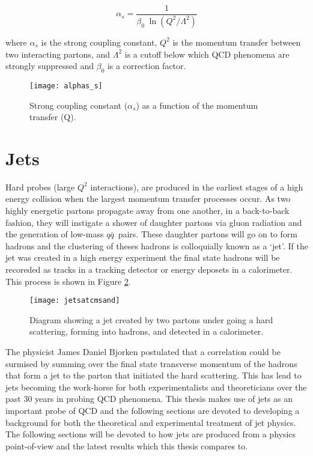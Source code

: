 \begin{equation}
\alpha_{s} = \frac{1}{\beta_{0} \; \ln(Q^{2}/\Lambda^{2} )}
\label{eq:alpha_s}
\end{equation}

\noindent
where $\alpha_{s}$ is the strong coupling constant, $Q^{2}$ is the momentum transfer between two interacting partons, and $\Lambda^{2}$ is a cutoff below which QCD phenomena are strongly suppressed and $\beta_{0}$ is a correction factor.

\begin{figure}[h]
\texttt{[image: alphas\_s]}
\centering
\caption{Strong coupling constant ($\alpha_{s}$) as a function of the momentum transfer (Q)\cite{CMS:2014mna}.}
\label{fig:as}
\end{figure}

\section{Jets}

Hard probes (large $Q^{2}$ interactions), are produced in the earliest stages of a high energy collision when the largest momentum transfer processes occur.  As two highly energetic partons propagate away from one another, in a back-to-back fashion, they will instigate a shower of daughter partons via gluon radiation and the generation of low-mass $q \bar{q}$\, pairs.  These daughter partons will go on to form hadrons and the clustering of theses hadrons is colloquially known as a `jet'.  If the jet was created in a high energy experiment the final state hadrons will be recoreded as tracks in a tracking detector or energy deposets in a calorimeter.  This process is shown in Figure \ref{fig:MakeAJet}.



\begin{figure}[h]
\texttt{[image: jetsatcmsand]}
\centering
\caption{Diagram showing a jet created by two partons under going a hard scattering, forming into hadrons, and detected in a calorimeter\cite{JetPic}.}
\label{fig:MakeAJet}
\end{figure}

The physicist James Daniel Bjorken postulated that a correlation could be surmised by summing over the final state transverse momentum of the hadrons that form a jet to the parton that initiated the hard scattering\cite{PhysRev.179.1547}\cite{Bjorken:1973kd}.  This has lead to jets becoming the work-horse for both experimentalists and theoreticians over the past 30 years in probing QCD phenomena.  This thesis makes use of jets as an important probe of QCD and the following sections are devoted to developing a background for both the theoretical and experimental treatment of jet physics.  The following sections will be devoted to how jets are produced from a physics point-of-view and the latest results which this thesis compares to.

